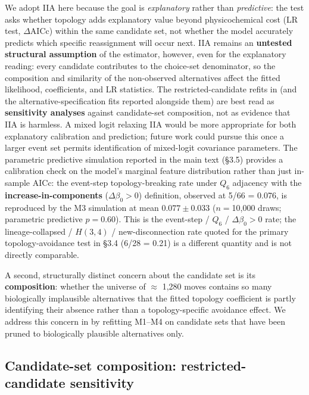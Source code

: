 \documentclass[preprint,11pt,authoryear,a4paper]{elsarticle}
\begin{document}
We adopt IIA here because the goal is \emph{explanatory} rather than
\emph{predictive}: the test asks whether topology adds explanatory value
beyond physicochemical cost (LR test, \(\Delta\)AICc) within the same
candidate set, not whether the model accurately predicts which specific
reassignment will occur next. IIA remains an \textbf{untested structural
assumption} of the estimator, however, even for the explanatory reading:
every candidate contributes to the choice-set denominator, so the
composition and similarity of the non-observed alternatives affect the
fitted likelihood, coefficients, and LR statistics. The
restricted-candidate refits in  (and the
alternative-specification fits reported alongside them) are best read as
\textbf{sensitivity analyses} against candidate-set composition, not as
evidence that IIA is harmless. A mixed logit relaxing IIA would be more
appropriate for both explanatory calibration and prediction; future work
could pursue this once a larger event set permits identification of
mixed-logit covariance parameters. The parametric predictive simulation
reported in the main text (§3.5) provides a calibration check on the
model's marginal feature distribution rather than just in-sample AICc:
the event-step topology-breaking rate under \(Q_{6}\) adjacency with the
\textbf{increase-in-components} (\(\Delta\beta_{0} > 0\)) definition,
observed at 5/66 = 0.076, is reproduced by the M3 simulation at mean
\(0.077 \pm 0.033\) (\(n =\)10,000 draws; parametric predictive
\(p = 0.60\)). This is the event-step / \(Q_{6}\) /
\(\Delta\beta_{0} > 0\) rate; the lineage-collapsed / \(H(3,4)\) /
new-disconnection rate quoted for the primary topology-avoidance test in
§3.4 (6/28 = 0.21) is a different quantity and is not directly
comparable.

A second, structurally distinct concern about the candidate set is its
\textbf{composition}: whether the universe of \(\approx\) 1,280 moves
contains so many biologically implausible alternatives that the fitted
topology coefficient is partly identifying their absence rather than a
topology-specific avoidance effect. We address this concern in
 by refitting M1--M4 on candidate sets that
have been pruned to biologically plausible alternatives only.

\subsection{Candidate-set composition: restricted-candidate
sensitivity}\label{sec:s-iia-restricted}
\end{document}

